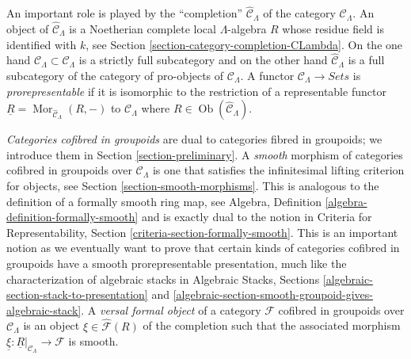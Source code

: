 \documentclass{stacks-project}
\theoremstyle{plain}
\theoremstyle{definition}
\theoremstyle{remark}
\numberwithin{equation}{subsection}
\def\Mor{\mathop{\mathrm{Mor}}\nolimits}
\def\Ob{\mathop{\mathrm{Ob}}\nolimits}
\begin{document}
\medskip\noindent
An important role is played by the ``completion''
$\widehat{\mathcal{C}}_\Lambda$ of the category $\mathcal{C}_\Lambda$.
An object of $\widehat{\mathcal{C}}_\Lambda$ is a Noetherian complete
local $\Lambda$-algebra $R$ whose residue field is identified with $k$, see
Section \ref{section-category-completion-CLambda}.
On the one hand $\mathcal{C}_\Lambda \subset \widehat{\mathcal{C}}_\Lambda$
is a strictly full subcategory and on the other hand
$\widehat{\mathcal{C}}_\Lambda$ is a full subcategory of the category
of pro-objects of $\mathcal{C}_\Lambda$. A functor
$\mathcal{C}_\Lambda \to \textit{Sets}$ is {\it prorepresentable}
if it is isomorphic to the restriction of a representable functor
$\underline{R} = \Mor_{\widehat{\mathcal{C}}_\Lambda}(R, -)$
to $\mathcal{C}_\Lambda$ where
$R \in \Ob(\widehat{\mathcal{C}}_\Lambda)$.

\medskip\noindent
{\it Categories cofibred in groupoids} are dual to categories fibred in
groupoids; we introduce them in Section \ref{section-preliminary}.
A {\it smooth} morphism of categories cofibred in groupoids over
$\mathcal{C}_\Lambda$ is one that satisfies the infinitesimal lifting
criterion for objects, see
Section \ref{section-smooth-morphisms}.
This is analogous to the definition of a formally smooth ring map, see
Algebra, Definition \ref{algebra-definition-formally-smooth}
and is exactly dual to the notion in
Criteria for Representability, Section \ref{criteria-section-formally-smooth}.
This is an important notion as we eventually want to prove that certain
kinds of categories cofibred in groupoids have a smooth prorepresentable
presentation, much like the characterization of algebraic stacks in
Algebraic Stacks, Sections \ref{algebraic-section-stack-to-presentation} and
\ref{algebraic-section-smooth-groupoid-gives-algebraic-stack}.
A {\it versal formal object} of a category $\mathcal{F}$ cofibred
in groupoids over $\mathcal{C}_\Lambda$ is an object
$\xi \in \widehat{\mathcal{F}}(R)$ of the completion such that the
associated morphism
$\underline{\xi} : \underline{R}|_{\mathcal{C}_\Lambda} \to \mathcal{F}$
is smooth.
\end{document}
